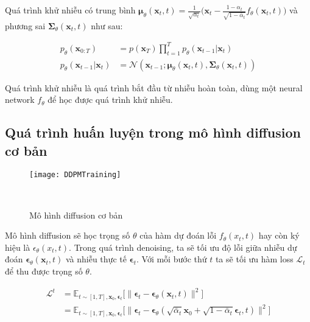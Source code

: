 Quá trình khử nhiễu có trung bình $\boldsymbol{\mu}_\theta(\mathbf{x}_t, t) = {\frac{1}{\sqrt{\alpha_t}} \Big( \mathbf{x}_t - \frac{1 - \alpha_t}{\sqrt{1 - \bar{\alpha}_t}}  f_\theta(\mathbf{x}_t, t) \Big)}$ và phương sai $\boldsymbol{\Sigma}_\theta(\mathbf{x}_t, t)$ như sau:

\begin{equation}
	\label{eq:denoising_process}
	\begin{aligned}
		p_\theta(\mathbf{x}_{0:T})
		&= p(\mathbf{x}_T) \prod^T_{t=1} p_\theta(\mathbf{x}_{t-1} \vert \mathbf{x}_t) \\
		p_\theta(\mathbf{x}_{t-1} \vert \mathbf{x}_t) &= \mathcal{N}(\mathbf{x}_{t-1};  \boldsymbol{\mu}_\theta(\mathbf{x}_t, t), \boldsymbol{\Sigma}_\theta(\mathbf{x}_t, t))
	\end{aligned}
\end{equation}

Quá trình khử nhiễu là quá trình bắt đầu từ nhiễu hoàn toàn, dùng một neural network $f_\theta$ để học được quá trình khử nhiễu.


\subsection{Quá trình huấn luyện trong mô hình diffusion cơ bản}
	
	\begin{figure}[H]
		\centering
		\texttt{[image: DDPMTraining]}
		\caption{Mô hình diffusion cơ bản}
		\label{fig:basic_diffusion}\
		\vspace{-5pt}
	\end{figure}
	
	Mô hình diffusion sẽ học trọng số $\theta$ của hàm dự đoán lỗi $f_{\theta} (x_t, t)$ hay còn ký hiệu là  $\epsilon_{\theta} (x_t, t)$. Trong quá trình denoising, ta sẽ tối ưu độ lỗi giữa nhiễu dự đoán $\boldsymbol{\epsilon}_\theta(\mathbf{x}_t, t)$ và nhiễu thực tế $\boldsymbol{\epsilon}_t$. Với mỗi bước thứ $t$ ta sẽ tối ưu hàm loss $\mathcal{L}_{t}$ để thu được trọng số $\theta$.
	
	\begin{equation}
		\label{eq:diffusion_loss}
		\begin{aligned}
			\mathcal{L}^t
			&= \mathbb{E}_{t \sim [1, T], \mathbf{x}_0, \boldsymbol{\epsilon}_t} \Big[\|\boldsymbol{\epsilon}_t - \boldsymbol{\epsilon}_\theta(\mathbf{x}_t, t)\|^2 \Big] \\
			&= \mathbb{E}_{t \sim [1, T], \mathbf{x}_0, \boldsymbol{\epsilon}_t} \Big[\|\boldsymbol{\epsilon}_t - \boldsymbol{\epsilon}_\theta(\sqrt{\bar{\alpha}_t}\mathbf{x}_0 + \sqrt{1 - \bar{\alpha}_t}\boldsymbol{\epsilon}_t, t)\|^2 \Big]
		\end{aligned}
	\end{equation}


